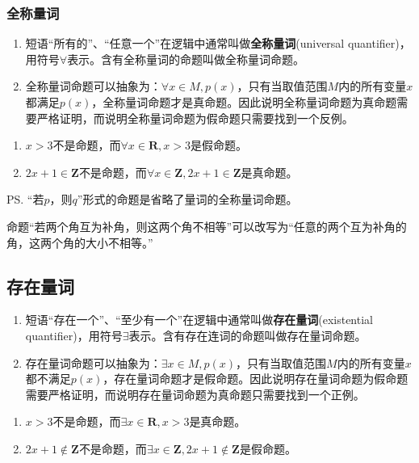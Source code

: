 \subsubsection*{全称量词}
    \begin{enumerate}
        \item 短语“所有的”、“任意一个”在逻辑中通常叫做\textbf{全称量词}(universal quantifier)，用符号$\forall$表示。含有全称量词的命题叫做全称量词命题。
        \item 全称量词命题可以抽象为：$\forall x \in M, p(x)$，只有当取值范围$M$内的所有变量$x$都满足$p(x)$，全称量词命题才是真命题。因此说明全称量词命题为真命题需要严格证明，而说明全称量词命题为假命题只需要找到一个反例。
    \end{enumerate}
    \begin{example}
        \begin{enumerate}
            \item $x > 3$不是命题，而$\forall x \in \mathbf{R}, x > 3$是假命题。
            \item $2x+1 \in \mathbf{Z}$不是命题，而$\forall x \in \mathbf{Z}, 2x+1 \in \mathbf{Z}$是真命题。
        \end{enumerate}
    \end{example}
    \ps “若$p$，则$q$”形式的命题是省略了量词的全称量词命题。
    \begin{example}
        命题“若两个角互为补角，则这两个角不相等”可以改写为“任意的两个互为补角的角，这两个角的大小不相等。”
    \end{example}
    
\subsection*{存在量词}
\begin{enumerate}
    \item 短语“存在一个”、“至少有一个”在逻辑中通常叫做\textbf{存在量词}(existential quantifier)，用符号$\exists$表示。含有存在连词的命题叫做存在量词命题。
    \item 存在量词命题可以抽象为：$\exists x \in M, p(x)$，只有当取值范围$M$内的所有变量$x$都不满足$p(x)$，存在量词命题才是假命题。因此说明存在量词命题为假命题需要严格证明，而说明存在量词命题为真命题只需要找到一个正例。
\end{enumerate}
\begin{example}
    \begin{enumerate}
        \item $x > 3$不是命题，而$\exists x \in \mathbf{R}, x > 3$是真命题。
        \item $2x+1 \notin \mathbf{Z}$不是命题，而$\exists x \in \mathbf{Z}, 2x+1 \notin \mathbf{Z}$是假命题。
    \end{enumerate}   
\end{example}
    


